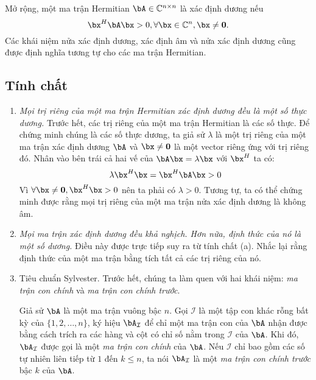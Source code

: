 Mở rộng, một ma trận Hermitian $\bA \in \mathbb{C}^{n\times n}$ là xác định dương nếu
\begin{equation}
    \bx^H\bA\bx > 0, \forall \bx \in \mathbb{C}^{n}, \bx \neq \mathbf{0}.
\end{equation}
Các khái niệm nửa xác định dương, xác định âm và nửa xác định dương cũng được
định nghĩa tương tự cho các ma trận Hermitian.
\subsection{Tính chất} %
\label{sub:tinh_chat}
\begin{enumerate}

    \item \textit{Mọi trị riêng của một ma trận Hermitian xác định dương đều là một số
    thực dương.}  Trước hết, các trị riêng của một ma trận Hermitian là các số
    thực. Để chứng minh chúng là các số thực dương, ta giả sử $\lambda$ là một
    trị riêng của một ma trận xác định dương $\bA$ và $\bx \neq \mathbf{0}$ là
    một vector riêng ứng với trị riêng đó. Nhân vào bên trái cả hai vế của
    $\bA\bx = \lambda \bx$ với $\bx^H$ ta có:
    \begin{equation}
        \lambda \bx^H \bx = \bx^H \bA \bx > 0
    \end{equation}
    Vì $\forall \bx \neq \mathbf{0}, \bx^H\bx > 0$ nên ta phải có $\lambda > 0$. Tương
    tự, ta có thể chứng minh được rằng mọi trị riêng của một ma trận
    nửa xác định dương là không âm.


    \item \textit{Mọi ma trận xác định dương đều khả nghịch. Hơn nữa, định thức
    của nó là một số dương.}  Điều này được trực tiếp suy ra từ tính chất (a).
    Nhắc lại rằng định thức của một ma trận bằng tích tất cả các trị riêng của
    nó.


    \def\AI{\bA_{\mathcal{I}}}
    \item Tiêu chuẩn Sylvester. Trước hết, chúng ta làm quen với hai khái niệm:
    \textit{ma trận con chính} và \textit{ma trận con chính trước}.
    
    Giả sử $\bA$ là một ma trận vuông bậc $n$. Gọi $\mathcal{I}$ là một tập con
    khác rỗng bất kỳ của $\{1, 2, \dots, n\}$, ký hiệu $\AI$ để chỉ một ma trận
    con của $\bA$ nhận được bằng cách trích ra các hàng và cột có chỉ số nằm
    trong $\mathcal{I}$ của $\bA$. Khi đó, $\AI$ được gọi là một \textit{ma trận
    con chính} của $\bA$. Nếu $\mathcal{I}$ chỉ bao gồm các số tự nhiên liên
    tiếp từ $1$ đến $k \leq  n$, ta nói $\AI$ là một \textit{ma trận con chính
    trước} bậc $k$ của $\bA$.


\end{enumerate}
